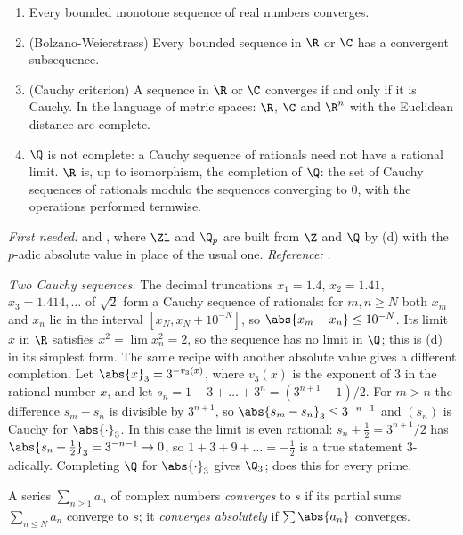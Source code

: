 \begin{theorem}\label{thm:prereq:completeness}
\begin{enumerate}[label=(\alph*)]
\item Every bounded monotone sequence of real numbers converges.
\item (Bolzano-Weierstrass) Every bounded sequence in $\R$ or $\C$ has a convergent subsequence.
\item (Cauchy criterion) A sequence in $\R$ or $\C$ converges if and only if it is Cauchy. In the
language of metric spaces: $\R$, $\C$ and $\R^n$ with the Euclidean distance are complete.
\item $\Q$ is not complete: a Cauchy sequence of rationals need not have a rational limit. $\R$ is,
up to isomorphism, the completion of $\Q$: the set of Cauchy sequences of rationals modulo the
sequences converging to $0$, with the operations performed termwise.
\end{enumerate}
\end{theorem}
\noindent\emph{First needed:}  and , where $\Zl$ and $\Q_p$ are
built from $\Z$ and $\Q$ by (d) with the $p$-adic absolute value in place of the usual one.
\emph{Reference:} \cite[Chapters 1 and 3, Theorem 3.11]{Rudin76}.

\emph{Two Cauchy sequences.} The decimal truncations $x_1=1.4$, $x_2=1.41$, $x_3=1.414,\dots$ of
$\sqrt2$ form a Cauchy sequence of rationals: for $m,n\ge N$ both $x_m$ and $x_n$ lie in the
interval $[x_N,x_N+10^{-N}]$, so $\abs{x_m-x_n}\le10^{-N}$. Its limit $x$ in $\R$ satisfies
$x^2=\lim x_n^2=2$, so the sequence has no limit in $\Q$; this is (d) in its simplest form. The
same recipe with another absolute value gives a different completion. Let $\abs{x}_3=3^{-v_3(x)}$,
where $v_3(x)$ is the exponent of $3$ in the rational number $x$, and let
$s_n=1+3+\dots+3^n=(3^{n+1}-1)/2$. For $m>n$ the difference $s_m-s_n$ is divisible by $3^{n+1}$, so
$\abs{s_m-s_n}_3\le3^{-n-1}$ and $(s_n)$ is Cauchy for $\abs{\cdot}_3$. In this case the limit is
even rational: $s_n+\tfrac12=3^{n+1}/2$ has $\abs{s_n+\tfrac12}_3=3^{-n-1}\to0$, so
$1+3+9+\dots=-\tfrac12$ is a true statement $3$-adically. Completing $\Q$ for $\abs{\cdot}_3$ gives
$\Q_3$;  does this for every prime.

\begin{definition}[series]\label{def:prereq:series}
A series $\sum_{n\ge1}a_n$ of complex numbers \emph{converges} to $s$ if its partial sums
$\sum_{n\le N}a_n$ converge to $s$; it \emph{converges absolutely} if $\sum\abs{a_n}$ converges.
\end{definition}

